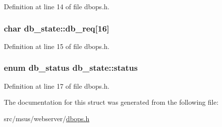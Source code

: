 Definition at line 14 of file dbops.\-h.

\hypertarget{structdb__state_aaacfe4e1d9c23b3eeed0f6a96da1874d}{
\subsubsection[{db\-\_\-req}]{\setlength{\rightskip}{0pt plus 5cm}char db\-\_\-state\-::db\-\_\-req\mbox{[}16\mbox{]}}}\label{structdb__state_aaacfe4e1d9c23b3eeed0f6a96da1874d}


Definition at line 15 of file dbops.\-h.

\hypertarget{structdb__state_a55975b94a2a298c08156b77d1dae8973}{
\subsubsection[{status}]{\setlength{\rightskip}{0pt plus 5cm}enum {\bf db\-\_\-status} db\-\_\-state\-::status}}\label{structdb__state_a55975b94a2a298c08156b77d1dae8973}


Definition at line 17 of file dbops.\-h.



The documentation for this struct was generated from the following file\-:\begin{DoxyCompactItemize}
\item 
src/msus/webserver/\hyperlink{dbops_8h}{dbops.\-h}\end{DoxyCompactItemize}
